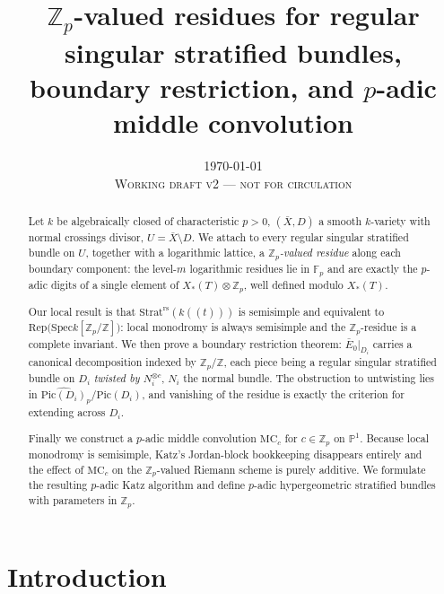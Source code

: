 \documentclass[11pt,reqno]{amsart}
\newcommand{\Zp}{\mathbb{Z}_p}
\newcommand{\Fp}{\mathbb{F}_p}
\newcommand{\ZZ}{\mathbb{Z}}
\newcommand{\PP}{\mathbb{P}}
\newcommand{\Strat}{\mathrm{Strat}}
\newcommand{\rs}{\mathrm{rs}}
\newcommand{\Pic}{\mathrm{Pic}}
\newcommand{\Rep}{\mathrm{Rep}}
\newcommand{\Spec}{\mathrm{Spec}}
\newcommand{\MC}{\mathrm{MC}}
\newcommand{\Xst}{X_*(T)}
\theoremstyle{plain}
\theoremstyle{definition}
\theoremstyle{remark}
\numberwithin{equation}{section}
\begin{document}
\title[$\Zp$-valued residues]{$\Zp$-valued residues for regular singular
stratified bundles, boundary restriction, and $p$-adic middle convolution}

\author{}
\address{}
\email{}

\date{\today\\ \textsc{Working draft v2 --- not for circulation}}

\begin{abstract}
Let $k$ be algebraically closed of characteristic $p>0$, $(\bar X,D)$ a
smooth $k$-variety with normal crossings divisor, $U=\bar X\setminus D$.
We attach to every regular singular stratified bundle on $U$, together
with a logarithmic lattice, a \emph{$\Zp$-valued residue} along each
boundary component: the level-$m$ logarithmic residues lie in $\Fp$ and
are exactly the $p$-adic digits of a single element of $\Xst\otimes\Zp$,
well defined modulo $\Xst$.

Our local result is that $\Strat^{\rs}(k((t)))$ is semisimple and
equivalent to $\Rep\bigl(\Spec k[\Zp/\ZZ]\bigr)$: local monodromy is
always semisimple and the $\Zp$-residue is a complete invariant.  We then
prove a boundary restriction theorem: $\bar E_0|_{D_i}$ carries a
canonical decomposition indexed by $\Zp/\ZZ$, each piece being a
regular singular stratified bundle on $D_i$ \emph{twisted by
$N_i^{\otimes c}$}, $N_i$ the normal bundle.  The obstruction to
untwisting lies in $\widehat{\Pic(D_i)}_p/\Pic(D_i)$, and vanishing of the
residue is exactly the criterion for extending across $D_i$.

Finally we construct a $p$-adic middle convolution $\MC_c$ for
$c\in\Zp$ on $\PP^1$.  Because local monodromy is semisimple, Katz's
Jordan-block bookkeeping disappears entirely and the effect of $\MC_c$ on
the $\Zp$-valued Riemann scheme is purely additive.  We formulate the
resulting $p$-adic Katz algorithm and define $p$-adic hypergeometric
stratified bundles with parameters in $\Zp$.
\end{abstract}

\maketitle

\setcounter{tocdepth}{1}
\tableofcontents

\section{Introduction}
\end{document}
